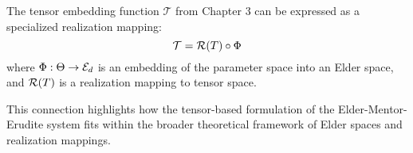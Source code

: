 \begin{proposition}
The tensor embedding function $\mathcal{T}$ from Chapter 3 can be expressed as a specialized realization mapping:
\begin{equation}
\mathcal{T} = \mathcal{R}(T) \circ \Phi
\end{equation}
where $\Phi: \Theta \rightarrow \mathcal{E}_{d}$ is an embedding of the parameter space into an Elder space, and $\mathcal{R}(T)$ is a realization mapping to tensor space.
\end{proposition}

This connection highlights how the tensor-based formulation of the Elder-Mentor-Erudite system fits within the broader theoretical framework of Elder spaces and realization mappings.